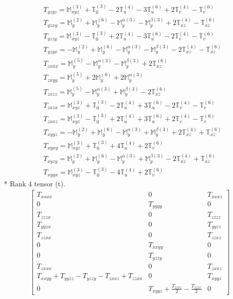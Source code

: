 \documentclass[fleqn,8pt,landscape]{jsarticle}
\begin{document}
\begin{align*}
& T_{yzyz} = \mathbb{M}_{xyz}^{(3)} + \mathbb{T}_{0}^{(3)} - 2 \mathbb{T}_{u}^{(4)} - 3 \mathbb{T}_{u}^{(6)} + 2 \mathbb{T}_{v}^{(4)} - \mathbb{T}_{v}^{(6)} \\
& T_{yzxy} = \mathbb{M}_{y}^{(2)} + \mathbb{M}_{y}^{(6)} - \mathbb{M}_{y}^{\alpha(3)} - \mathbb{M}_{y}^{\beta(3)} + 2 \mathbb{T}_{xz}^{(4)} - \mathbb{T}_{xz}^{(6)} \\
& T_{yzzy} = \mathbb{M}_{xyz}^{(3)} - \mathbb{T}_{0}^{(3)} + 2 \mathbb{T}_{u}^{(4)} - 3 \mathbb{T}_{u}^{(6)} - 2 \mathbb{T}_{v}^{(4)} - \mathbb{T}_{v}^{(6)} \\
& T_{yzyx} = - \mathbb{M}_{y}^{(2)} + \mathbb{M}_{y}^{(6)} - \mathbb{M}_{y}^{\alpha(3)} - \mathbb{M}_{y}^{\beta(3)} - 2 \mathbb{T}_{xz}^{(4)} - \mathbb{T}_{xz}^{(6)} \\
& T_{zxxx} = \mathbb{M}_{y}^{(5)} - \mathbb{M}_{y}^{\alpha(3)} - \mathbb{M}_{y}^{\beta(3)} + 2 \mathbb{T}_{xz}^{(6)} \\
& T_{zxyy} = \mathbb{M}_{y}^{(5)} + 2 \mathbb{M}_{y}^{(6)} + 2 \mathbb{M}_{y}^{\alpha(3)} \\
& T_{zxzz} = \mathbb{M}_{y}^{(5)} - \mathbb{M}_{y}^{\alpha(3)} + \mathbb{M}_{y}^{\beta(3)} - 2 \mathbb{T}_{xz}^{(6)} \\
& T_{zxzx} = \mathbb{M}_{xyz}^{(3)} + \mathbb{T}_{0}^{(3)} - 2 \mathbb{T}_{u}^{(4)} + 3 \mathbb{T}_{u}^{(6)} - 2 \mathbb{T}_{v}^{(4)} - \mathbb{T}_{v}^{(6)} \\
& T_{zxxz} = \mathbb{M}_{xyz}^{(3)} - \mathbb{T}_{0}^{(3)} + 2 \mathbb{T}_{u}^{(4)} + 3 \mathbb{T}_{u}^{(6)} + 2 \mathbb{T}_{v}^{(4)} - \mathbb{T}_{v}^{(6)} \\
& T_{xyyz} = - \mathbb{M}_{y}^{(2)} + \mathbb{M}_{y}^{(6)} - \mathbb{M}_{y}^{\alpha(3)} + \mathbb{M}_{y}^{\beta(3)} + 2 \mathbb{T}_{xz}^{(4)} + \mathbb{T}_{xz}^{(6)} \\
& T_{xyxy} = \mathbb{M}_{xyz}^{(3)} + \mathbb{T}_{0}^{(3)} + 4 \mathbb{T}_{u}^{(4)} + 2 \mathbb{T}_{v}^{(6)} \\
& T_{xyzy} = \mathbb{M}_{y}^{(2)} + \mathbb{M}_{y}^{(6)} - \mathbb{M}_{y}^{\alpha(3)} + \mathbb{M}_{y}^{\beta(3)} - 2 \mathbb{T}_{xz}^{(4)} + \mathbb{T}_{xz}^{(6)} \\
& T_{xyyx} = \mathbb{M}_{xyz}^{(3)} - \mathbb{T}_{0}^{(3)} - 4 \mathbb{T}_{u}^{(4)} + 2 \mathbb{T}_{v}^{(6)}
\end{align*}
* Rank 4 tensor (t).
\begin{align*}
\begin{bmatrix} T_{xxxx} & 0 & T_{xxxz} \\ 0 & T_{yyyy} & 0 \\ T_{zzzx} & 0 & T_{zzzz} \\ T_{yyzx} & 0 & T_{yyzz} \\ T_{zzxx} & 0 & T_{zzxz} \\ 0 & T_{xxyy} & 0 \\ 0 & T_{yzzy} & 0 \\ T_{zxxx} & 0 & T_{zxxz} \\ T_{xxyy} + T_{yyzz} - T_{yzzy} - T_{zxxz} + T_{zzxx} & 0 & T_{xyyz} \\ 0 & T_{xyyz} + \frac{T_{zzxz}}{2} - \frac{T_{zzzx}}{2} & 0 \end{bmatrix}
\end{align*}
\end{document}
